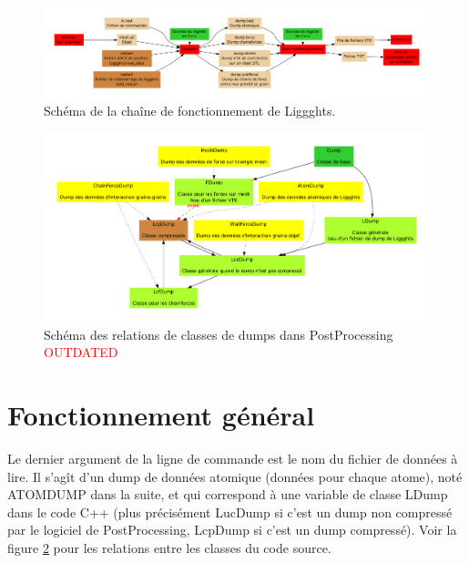 \documentclass[a4paper,12pt]{article}
\begin{document}
\begin{figure}
 \includegraphics[width=\linewidth]{Liggghts.pdf}
 \caption{Sch\'ema de la cha\^ine de fonctionnement de Liggghts.}
 \label{ClassesCPP}
\end{figure}

\begin{figure}
 \includegraphics[width=\linewidth]{Dump.pdf}
 \caption{Sch\'ema des relations de classes de dumps dans PostProcessing \textcolor{red}{OUTDATED}}
 \label{ClassesCPP}
\end{figure}




\newpage
\section{Fonctionnement g\'en\'eral}
Le dernier argument de la ligne de commande est le nom du fichier de donn\'ees \`a lire. Il s'ag\^it d'un dump de donn\'ees atomique (donn\'ees pour chaque atome), not\'e ATOMDUMP dans la suite, et qui correspond \`a une variable de classe LDump dans le code C++ (plus pr\'ecis\'ement LucDump si c'est un dump non compress\'e par le logiciel de PostProcessing, LcpDump si c'est un dump compress\'e). Voir la figure \ref{ClassesCPP} pour les relations entre les classes du code source.
\end{document}

